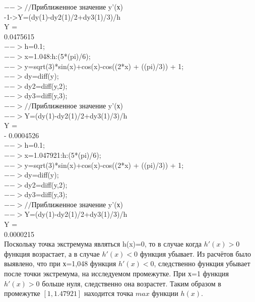 \documentclass[russian,utf8,nocolumnxxxi,nocolumnxxxii]{eskdtext}
\begin{document}
$-->//$Приближенное значение y’(х)\\

-1->Y=(dy(1)-dy2(1)/2+dy3(1)/3)/h\\
 Y  =\\

    0.0475615\\

$-->$h=0.1;\\

$-->$x=1.048:h:(5*(pi)/6);\\

$-->$y=sqrt(3)*sin(x)+cos(x)-cos((2*x) + ((pi)/3)) + 1;\\

$-->$dy=diff(y);\\

$-->$dy2=diff(y,2);\\

$-->$dy3=diff(y,3);\\

$-->//$Приближенное значение y’(х)\\

$-->$Y=(dy(1)-dy2(1)/2+dy3(1)/3)/h\\
 Y  =\\

  - 0.0004526\\

$-->$h=0.1;\\

$-->$x=1.047921:h:(5*(pi)/6);\\

$-->$y=sqrt(3)*sin(x)+cos(x)-cos((2*x) + ((pi)/3)) + 1;\\

$-->$dy=diff(y);\\

$-->$dy2=diff(y,2);\\

$-->$dy3=diff(y,3);\\

$-->//$Приближенное значение y’(х)\\

$-->$Y=(dy(1)-dy2(1)/2+dy3(1)/3)/h\\
 Y  =\\

    0.0000215\\

Поскольку точка экстремума являться h(x)=0, то в случае когда $h'(x)>0$ функция возрастает, а в случае $h'(x)<0$ функция убывает. Из расчётов было выявлено, что при х=1,048 функция $h'(x)<0$, следственно функция убывает после точки экстремума, на исследуемом промежутке. При х=1 функция $h'(x)>0$ больше нуля, следственно она возрастет. Таким образом в промежутке $[1,1.47921]$ находится точка $max$ функции $h(x)$.
\end{document}
